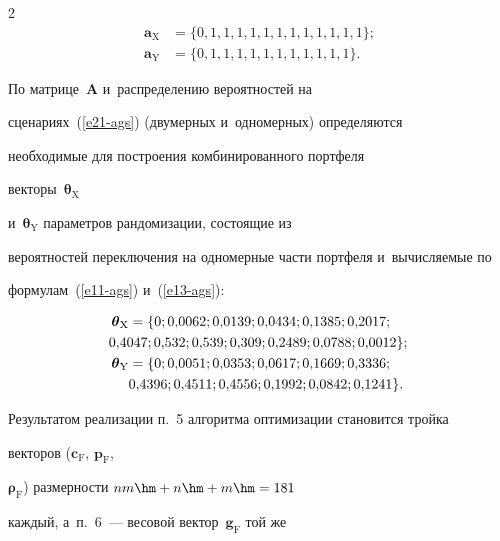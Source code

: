 \begin{multicols}{2}
\begin{align*}
\boldsymbol{a}_{\mathrm{X}} &= \{0, 1, 1, 1, 1, 1, 1, 1, 1, 1, 1, 1, 1\};\\ 


\boldsymbol{a}_{\mathrm{Y}} &= \{0, 1, 1, 1, 1, 1, 1, 1, 1, 1, 1, 1\}.


\end{align*}


  


  По матрице~$\mathbf{A}$ и~распределению вероятностей на 


сценариях~(\ref{e21-ags}) (двумерных и~одномерных) определяются 


необходимые для построения комбинированного портфеля 


векторы~$\boldsymbol{\theta}_{\mathrm{X}}$ 


и~$\boldsymbol{\theta}_{\mathrm{Y}}$ параметров рандомизации, состоящие из 


вероятностей переключения на одномерные части портфеля и~вы\-чис\-ля\-емые по 


формулам~(\ref{e11-ags}) и~(\ref{e13-ags}): 


  \begin{align*}


  \boldsymbol{\theta}_{\mathrm{X}} &= \{0; 0{,}0062; 0{,}0139; 


  0{,}0434; 0{,}1385;    0{,}2017;\\


  &\hspace*{-5mm}0{,}4047;  0{,}532; 0{,}539; 0{,}309; 0{,}2489; 0{,}0788; 0{,}0012\};\\


  \boldsymbol{\theta}_{\mathrm{Y}} &= \{0; 0{,}0051; 0{,}0353; 0{,}0617; 


  0{,}1669; 0{,}3336;\\


    & 0{,}4396;  0{,}4511; 0{,}4556; 0{,}1992; 0{,}0842; 0{,}1241\}. 


  \end{align*}


  


  Результатом реализации п.~5 алгоритма оптимизации становится тройка 


векторов ($\boldsymbol{c}_{\mathrm{F}}$, $\boldsymbol{p}_{\mathrm{F}}$, 


$\boldsymbol{\rho}_{\mathrm{F}}$) размерности $nm \hm+ n \hm+ m \hm= 181$ 


каждый, а~п.~6~--- весовой вектор~$\boldsymbol{g}_{\mathrm{F}}$ той же 



\end{multicols}
